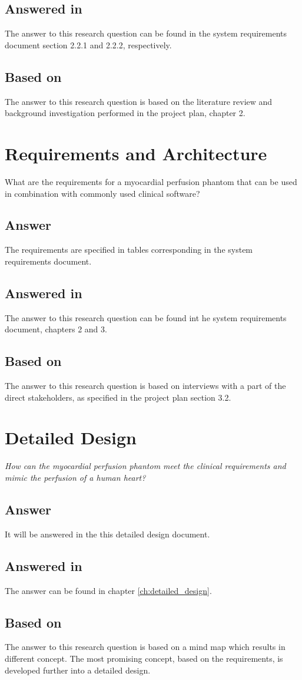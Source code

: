 \subsection*{Answered in}
The answer to this research question can be found in the system requirements document section 2.2.1 and 2.2.2, respectively.
\subsection*{Based on}
The answer to this research question is based on the literature review and background investigation performed in the project plan, chapter 2.
\section{Requirements and Architecture}
What are the requirements for a myocardial perfusion phantom that can be used in combination with commonly used clinical software?
\subsection*{Answer} 
The requirements are specified in tables corresponding in the system requirements document.
\subsection*{Answered in}
The answer to this research question can be found int he system requirements document, chapters 2  and 3.
\subsection*{Based on}
The answer to this research question is based on interviews with a part of the direct stakeholders, as specified in the project plan section 3.2.
\section{Detailed Design}
\textit{How can the myocardial perfusion phantom meet the clinical requirements and mimic the perfusion of a human heart?}
\subsection*{Answer}
It will be answered in the this detailed design document.
\subsection*{Answered in}
The answer can be found in chapter \ref{ch:detailed_design}.
\subsection*{Based on}
The answer to this research question is based on a mind map which results in different concept. The most promising concept, based on the requirements, is developed further into a detailed design. 
